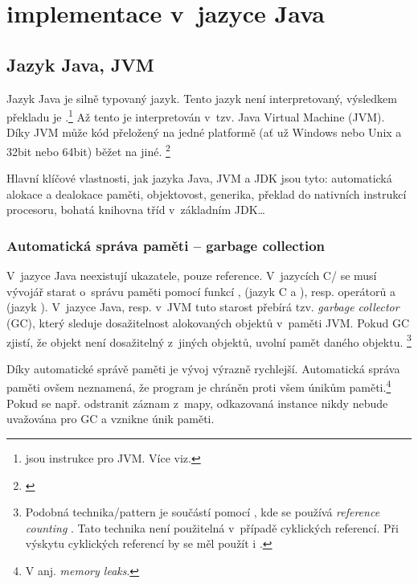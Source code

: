 \chapter{\MIndex{} implementace v~jazyce Java}


\section{Jazyk Java, JVM}

Jazyk Java je silně typovaný jazyk. Tento jazyk není interpretovaný,
výsledkem překladu je \bytecode{}.\footnote{\bytecode{} jsou instrukce pro JVM. Více viz. } Až tento \bytecode{} je interpretován v~tzv. Java Virtual Machine (JVM).
Díky JVM může kód přeložený na jedné platformě (ať už Windows nebo Unix a 32bit nebo 64bit) běžet na jiné. \footnote{\emph{}\cite{lindholm2013java}}

Hlavní klíčové vlastnosti, jak jazyka Java, JVM a JDK
jsou tyto: automatická alokace a dealokace paměti, objektovost, generika,
překlad \bytecode{} do nativních instrukcí procesoru, bohatá
knihovna tříd v~základním JDK\ldots{}

\subsection{Automatická správa paměti -- garbage collection}

V~jazyce Java neexistují ukazatele, pouze reference. V~jazycích C/\CC{}
se musí vývojář starat o~správu paměti pomocí funkcí ,
 (jazyk C a \CC), resp. operátorů  a 
(jazyk \CC). V~jazyce Java, resp. v~JVM \cite{lindholm2013java} tuto starost přebírá tzv. \emph{garbage
collector} (GC), který sleduje
dosažitelnost alokovaných objektů v~paměti JVM. Pokud GC
zjistí, že objekt není dosažitelný z~jiných objektů, uvolní pamět daného objektu.
\footnote{Podobná technika/pattern je součástí  pomocí ,
kde se používá \emph{reference counting} \cite{ISO:2012:CPP}. Tato technika není použitelná v~případě cyklických referencí. Při výskytu cyklických referencí by se měl použít i .
}

Díky automatické správě paměti je vývoj výrazně rychlejší.
Automatická správa paměti ovšem neznamená, že program je chráněn proti všem únikům paměti.\footnote{V anj. \emph{memory leaks}.}
Pokud se např.  odstranit záznam z~mapy, odkazovaná instance nikdy nebude uvažována pro GC a vznikne únik paměti.

